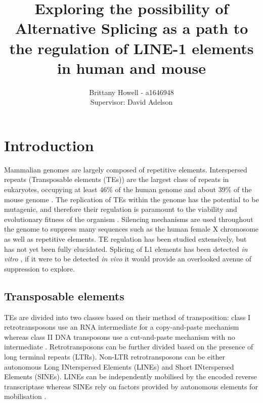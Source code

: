 \documentclass[12pt]{article}
\begin{document}
	
	\title{Exploring the possibility of Alternative Splicing as a path to the regulation of LINE-1 elements in human and mouse}
	\author{Brittany Howell - a1646948 \\ Supervisor: David Adelson}
	\date{}
	
	\maketitle
	
	
	\section{Introduction}
		
		Mammalian genomes are largely composed of repetitive elements.
		Interspersed repeats (Transposable elements (TEs)) are the largest class of repeats in eukaryotes, occupying at least 46\% of the human genome \citep{Lander01} and about 39\% of the mouse genome \citep{Waterson02}.
		The replication of TEs within the genome has the potential to be mutagenic, and therefore their regulation is paramount to the viability and evolutionary fitness of the organism \citep{Bodak14}.
		Silencing mechanisms are used throughout the genome to suppress many sequences such as the human female X chromosome as well as repetitive elements. 
		TE regulation has been studied extensively, but has not yet been fully elucidated.
		Splicing of L1 elements has been detected \textit{in vitro} \citep{Belancio06}, if it were to be detected \textit{in vivo} it would provide an overlooked avenue of suppression to explore. 
			
		
		\subsection{Transposable elements}
			
			TEs are divided into two classes based on their method of transposition: class I retrotransposons use an RNA intermediate for a copy-and-paste mechanism whereas class II DNA transposons use a cut-and-paste mechanism with no intermediate \citep{Feschotte07,Wicker07,Han10,Finnegan89}.
			Retrotransposons can be further divided based on the presence of long terminal repeats (LTRs).
			Non-LTR retrotransposons can be either autonomous Long INterspersed Elements (LINEs) and Short INterspersed Elements (SINEs).
			LINEs can be independently mobilised by the encoded reverse transcriptase whereas SINEs rely on factors provided by autonomous elements for mobilisation \citep{Jurka07}.
			
\end{document}
